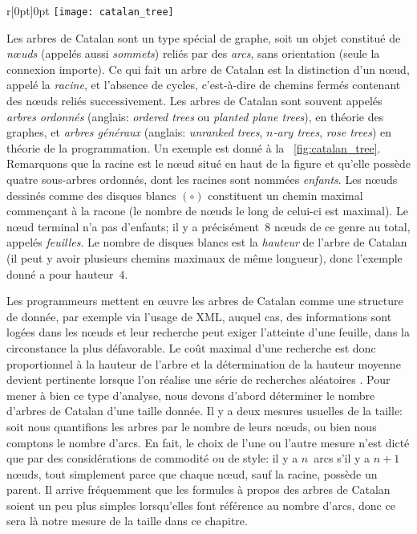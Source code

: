 %
\begin{wrapfigure}[9]{r}[0pt]{0pt}
\centering
\texttt{[image: catalan\_tree]}
\caption{Arbre de Catalan de hauteur~4}
\label{fig:catalan_tree}
\end{wrapfigure}
Les arbres de Catalan sont un type spécial de graphe, soit un objet
constitué de \emph{nœuds} (appelés aussi \emph{sommets}) reliés
par des \emph{arcs}, sans orientation (seule la connexion importe). Ce
qui fait un arbre de Catalan est la distinction d'un nœud, appelé
la \emph{racine}, et l'absence de cycles, c'est-à-dire de chemins
fermés contenant des nœuds reliés successivement. Les arbres de
Catalan sont souvent appelés \emph{arbres ordonnés} (anglais:
\emph{ordered trees} ou \emph{planted plane trees}), en théorie des
graphes, et \emph{arbres généraux} (anglais: \emph{unranked trees},
\emph{\(n\)-ary trees}, \emph{rose trees}) en théorie de la
programmation. Un exemple est donné à la
\fig~\ref{fig:catalan_tree}. Remarquons que la racine est le nœud
situé en haut de la figure et qu'elle possède quatre sous-arbres
ordonnés, dont les racines sont nommées \emph{enfants}. Les nœuds
dessinés comme des disques blancs \((\circ)\) constituent un chemin
maximal commençant à la racone (le nombre de nœuds le long de
celui-ci est maximal). Le nœud terminal n'a pas d'enfants; il y a
précisément~\(8\) nœuds de ce genre au total, appelés
\emph{feuilles}. Le nombre de disques blancs est la \emph{hauteur} de
l'arbre de Catalan (il peut y avoir plusieurs chemins maximaux de même
longueur), donc l'exemple donné a pour hauteur~\(4\).

Les programmeurs mettent en œuvre les arbres de Catalan comme une
structure de donnée, par exemple via l'usage de \textsf{XML}, auquel
cas, des informations sont logées dans les nœuds et leur recherche
peut exiger l'atteinte d'une feuille, dans la circonstance la plus
défavorable. Le coût maximal d'une recherche est donc proportionnel à
la hauteur de l'arbre et la détermination de la hauteur moyenne
devient pertinente lorsque l'on réalise une série de recherches
aléatoires \citep{VitterFlajolet_1990}. Pour mener à bien ce type
d'analyse, nous devons d'abord déterminer le nombre d'arbres de
Catalan d'une taille donnée. Il y a deux mesures usuelles de la
taille: soit nous quantifions les arbres par le nombre de leurs
nœuds, ou bien nous comptons le nombre d'arcs. En fait, le choix
de l'une ou l'autre mesure n'est dicté que par des considérations de commodité ou de style: il y a \(n\)~arcs s'il y a \(n+1\) nœuds, tout simplement parce que chaque nœud, sauf la racine, possède un parent. Il arrive fréquemment que les formules à propos des arbres de Catalan soient un peu plus simples lorsqu'elles font référence au nombre d'arcs, donc ce sera là notre mesure de la taille dans ce chapitre.

